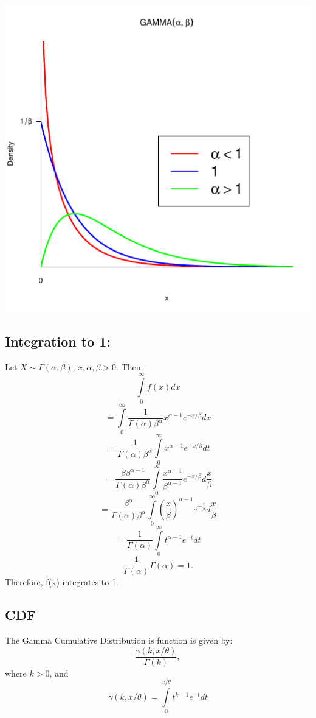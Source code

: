 \documentclass{article}
\begin{document}
  \begin{center}
  \includegraphics[scale=.5]{plot.pdf}
  \end{center}

  \subsection*{Integration to 1:}
  Let $X \sim \Gamma(\alpha,\beta)$, $x,\alpha,\beta > 0$. Then,
  \[
    \int\limits_0^\infty {f(x)dx}
  \]
  \[
    = \int\limits_0^\infty {\frac{1}{\Gamma(\alpha)\beta^\alpha}x^{\alpha-1}e^{-x/\beta}dx}
  \]
  \[
    = \frac{1}{\Gamma(\alpha) \beta^\alpha} \int\limits_0^\infty{x^{\alpha-1}e^{-x/\beta}dt}
  \]
  \[
    = \frac{\beta\beta^{\alpha-1}}{\Gamma(\alpha)\beta^\alpha} 
      \int\limits_0^\infty {\frac{x^{\alpha-1}}{\beta^{\alpha-1}}e^{-x/\beta}d\frac{x}{\beta}}
  \]
  \[
    = \frac{\beta^{\alpha}}{\Gamma(\alpha)\beta^\alpha}
      \int\limits_0^\infty
    { \left(\frac{x}{\beta}\right) ^ {\alpha-1} e^{-\frac{x}{\beta}} d\frac{x}{\beta}}
  \]
  \[
    = \frac{1}{\Gamma(\alpha)} \int\limits_0^\infty {t ^ {\alpha-1} e^{-t} dt}
  \]
  \[
    \frac{1}{\Gamma(\alpha)} \Gamma(\alpha) = 1.
  \]
  Therefore, f(x) integrates to 1. 
 
  \subsection*{CDF}
  The Gamma Cumulative Distribution is function is given by:
  \[
    \frac{\gamma(k,x/\theta)}{\Gamma(k)},
  \]
  where $k > 0$, and
  \[ 
    \gamma(k,x/\theta) = \int\limits_0^{x/\theta} {t^{k-1}e^{-t}dt}
  \]
\end{document}
